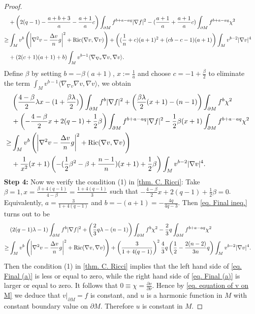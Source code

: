\documentclass[12pt]{amsart}
\numberwithin{equation}{section}
\numberwithin{lemma}{section}
\numberwithin{proposition}{section}
\numberwithin{corollary}{section}
\numberwithin{remark}{section}
\begin{document}
\begin{proof}
\begin{align*}
        &+\left(2(q-1)-\frac{a+b+3}{a}-\frac{a+1}{a}c\right)
        \int_{\partial M}f^{b+a-aq}|\nabla f|^2\notag
        -(\frac{a+1}{a}+\frac{a+1}{a}c)\int_{\partial M}f^{b+a-aq}\chi^2\\
        \geq & \int_M v^b\left(
        \left|\nabla^2 v-\frac{\Delta v}{n}g\right|^2
        +\mathrm{Ric}(\nabla v,\nabla v)
        \right)
        +\left((\frac{1}{n}+c)(a+1)^2
        +(cb-c-1)(a+1)\right)\int_M v^{b-2}|\nabla v|^4\notag\\
        &+\left(2(c+1)(a+1)+b\right)\int_M v^{b-1}\langle\nabla_{\nabla v}\nabla v,\nabla v\rangle.
    \end{align*}
   Define $\beta$ by setting $b=-\beta(a+1)$, $x:=\frac{1}{a}$ and choose $c=-1+\frac{\beta}{2}$ to eliminate the  term $\int_M v^{b-1}\langle \nabla_{\nabla v}\nabla v,\nabla v\rangle$, we obtain
    \begin{align}\label{eq. Final ineq.}
        &\left(\frac{4-\beta}{2}\lambda x-(1+\frac{\beta\lambda}{2})\right)
        \int_{\partial M}f^b|\nabla f|^2
        +\left(\frac{\beta\lambda}{2}(x+1)-(n-1)\right)
        \int_{\partial M}f^b\chi^2\notag\\
        &+\left(-\frac{4-\beta}{2}x+2(q-1)+\frac{1}{2}\beta\right)
        \int_{\partial M}f^{b+a-aq}|\nabla f|^2\notag
        -\frac{1}{2}\beta(x+1)\int_{\partial M}f^{b+a-aq}\chi^2\\
        \geq & \int_M v^b\left(
        \left|\nabla^2 v-\frac{\Delta v}{n}g\right|^2
        +\mathrm{Ric}(\nabla v,\nabla v)
        \right)\notag\\
        &+\frac{1}{x^2}(x+1)\left(
        -(\frac{1}{2}\beta^2-\beta+\frac{n-1}{n})(x+1)+\frac{1}{2}\beta
        \right)
        \int_M v^{b-2}|\nabla v|^4.
    \end{align}
    \textbf{Step 4:} Now we verify the condition (1) in \cref{thm. C. Ricci}: Take $\beta=1, x=\frac{\beta+4(q-1)}{4-\beta}=\frac{1+4(q-1)}{3}$ such that $-\frac{4-\beta}{2}x+2(q-1)+\frac{1}{2}\beta=0$. Equivalently, $a=\frac{3}{1+4(q-1)}$ and $b=-(a+1)=-\frac{4q}{4q-3}$. Then \cref{eq. Final ineq.} turns out to be
    \begin{align}\label{eq. Final (a)}
        &\left(2(q-1)\lambda-1 \right)\int_{\partial M}f^b|\nabla f|^2
        +\left(\frac{2}{3}q\lambda-(n-1)\right)\int_{\partial M}f^b\chi^2
        -\frac{2}{3}q\int_{\partial M}f^{b+a-aq}\chi^2\notag\\
        \geq& \int_M v^b\left(
        \left|\nabla^2 v-\frac{\Delta v}{n}g\right|^2
        +\mathrm{Ric}(\nabla v,\nabla v)
        \right)
        +\left(\frac{3}{1+4(q-1)}\right)^2
        \frac{4}{3}q
        \left(\frac{1}{2}-\frac{2(n-2)}{3n}q\right)
        \int_M v^{b-2}|\nabla v|^4.
    \end{align}
    Then the condition (1) in \cref{thm. C. Ricci} implies that the left hand side of \cref{eq. Final (a)} is less or equal to zero, while the right hand side of \cref{eq. Final (a)} is larger or equal to zero. It follows that $0\equiv\chi=\frac{\partial v}{\partial \nu}$. Hence by \cref{eq. equation of v on M} we deduce that $v|_{\partial M}=f$ is constant, and $u$ is a harmonic function in $M$ with constant boundary value on $\partial M$. Therefore $u$ is constant in $M$.


\end{proof}
\end{document}
